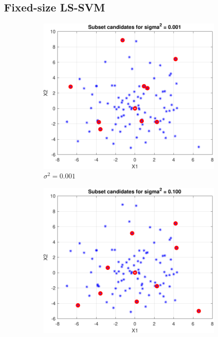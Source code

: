 \documentclass{article}
\begin{document}
    \subsection{Fixed-size LS-SVM}
        \begin{figure}[h]
             \centering
             \begin{subfigure}[b]{0.3\textwidth}
                 \centering
                 \includegraphics[width=\textwidth]{Assignment 3/figures/1_3/subsets_sig2_0.001.pdf}
                 \caption{$\sigma^2 = 0.001$}
                 \label{fig:subsets_sigma_1}
             \end{subfigure}
            \hfill
             \begin{subfigure}[b]{0.3\textwidth}
                 \centering
                 \includegraphics[width=\textwidth]{Assignment 3/figures/1_3/subsets_sig2_0.100.pdf}

\end{subfigure}
\end{figure}
\end{document}
